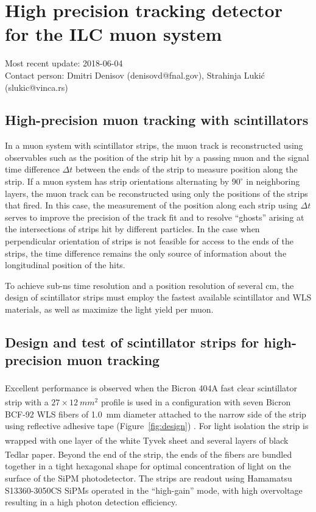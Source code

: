 \section{High precision tracking detector for the ILC muon system}
Most recent update: 2018-06-04 \\
Contact person: Dmitri Denisov (denisovd@fnal.gov), Strahinja Lukić (slukic@vinca.rs)

\subsection{High-precision muon tracking with scintillators}

In a muon system with scintillator strips, the muon track is reconstructed using observables such as the position of the strip hit by a passing muon and the signal time difference $\Delta t$ between the ends of the strip to measure position along the strip. If a muon system has strip orientations alternating by $90^{\circ}$ in neighboring layers, the muon track can be reconstructed using only the positions of the strips that fired. In this case, the measurement of the position along each strip using $\Delta t$ serves to improve the precision of the track fit and to resolve ``ghosts'' arising at the intersections of strips hit by different particles. In the case when perpendicular orientation of strips is not feasible for access to the ends of the strips, the time difference remains the only source of information about the longitudinal position of the hits.

To achieve sub-ns time resolution and a position resolution of several cm, the design of scintillator strips must employ the fastest available scintillator and WLS materials, as well as maximize the light yield per muon.

\subsection{Design and test of scintillator strips for high-precision muon tracking}

Excellent performance is observed when the Bicron\textsuperscript{\textcopyright} 404A fast clear scintillator strip with a $27 \times \SI{12}{mm^2}$ profile is used in a configuration with seven Bicron\textsuperscript{\textcopyright} BCF-92 WLS fibers of \SI{1.0}{mm} diameter attached to the narrow side of the strip using reflective adhesive tape (Figure~\ref{fig:design}) \cite{Denisov201754,Denisov2016120}. For light isolation the strip is wrapped with one layer of the white Tyvek\textsuperscript{\textregistered} sheet and several layers of black Tedlar\textsuperscript{\textregistered} paper. Beyond the end of the strip, the ends of the fibers are bundled together in a tight hexagonal shape for optimal concentration of light on the surface of the SiPM photodetector. The strips are readout using Hamamatsu S13360-3050CS SiPMs operated in the ``high-gain'' mode, with high overvoltage resulting in a high photon detection efficiency.

